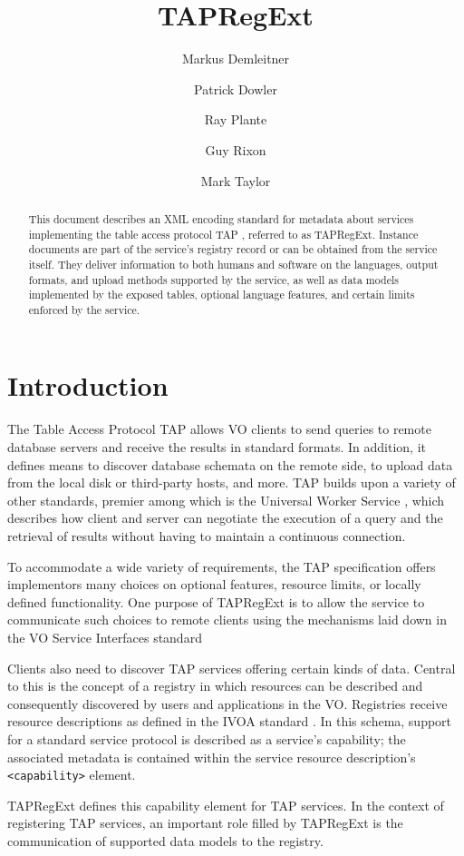 \documentclass{ivoa}
\author[http://www.ivoa.net/cgi-bin/twiki/bin/view/IVOA/MarkusDemleitner]{Markus
Demleitner}
\author[http://www.ivoa.net/cgi-bin/twiki/bin/view/IVOA/PatrickDowler]{Patrick
Dowler}
\author[http://www.ivoa.net/cgi-bin/twiki/bin/view/IVOA/RayPlante]{Ray
Plante}
\author[http://www.ivoa.net/cgi-bin/twiki/bin/view/IVOA/GuyRixon]{Guy
Rixon}
\author[http://www.ivoa.net/cgi-bin/twiki/bin/view/IVOA/MarkTaylor]{Mark
Taylor}
\title{TAPRegExt}
\begin{document}
\begin{abstract}
This document describes an XML encoding standard for metadata about
services implementing the table access protocol TAP \citep{std:TAP}, referred to as TAPRegExt.  Instance documents are
part of the service's registry record or can be obtained from the service
itself.  They deliver information to both humans and software on the languages,
output formats, and upload methods supported by the service, as well as data
models implemented by the exposed tables, optional language features,
and certain limits enforced by the service.
\end{abstract}


\section{Introduction}

\label{introduction}

The Table Access Protocol TAP \citep{std:TAP} allows
VO clients to send queries to remote database servers and receive the
results in standard formats.  In addition, it defines means to discover
database schemata on the remote side, to upload data from the local disk
or third-party hosts, and more.  TAP builds upon a variety of other
standards, premier among which is the Universal Worker Service 
\citep{std:UWS}, which describes how client and server
can negotiate the execution of a query and the retrieval of results
without having to maintain a continuous connection.

To accommodate a wide variety of requirements, the TAP specification
offers implementors many choices on optional features, resource limits, or
locally defined functionality.  One purpose of TAPRegExt is to allow the
service to communicate such choices to remote clients using the mechanisms
laid down in the VO Service Interfaces standard \citep{std:VOSI}

Clients also need to discover TAP services offering certain kinds of data.
Central to this is the concept of a registry in which resources can be
described and consequently discovered by users and applications in the VO.
Registries receive resource descriptions as defined in the IVOA standard 
\citep{std:VOR}. In this schema, support for 
a standard service protocol is described as a service's capability; the
associated metadata is contained within the service resource description's
\texttt{<capability>} element.

TAPRegExt defines this capability element for TAP services.  In the context
of registering TAP services, an important role filled by TAPRegExt is the 
communication of supported data models to the registry.
\end{document}
